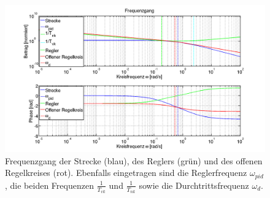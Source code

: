 \begin{figure}[h! width=\pagewidth]
    \includegraphics[width=\textwidth]{images/pidCompletePlot.png}
    \caption{%
        Frequenzgang der Strecke (blau), des  Reglers (gr\"un) und des offenen
        Regelkreises  (rot).  Ebenfalls  eingetragen  sind die  Reglerfrequenz
        $\omega_{pid}$,   die   beiden   Frequenzen   $\frac{1}{T_{vk}}$   und
        $\frac{1}{T_{nk}}$ sowie die Durchtrittsfrequenz $\omega_d$.
    }
    \label{fig:pid:complete}
\end{figure}
